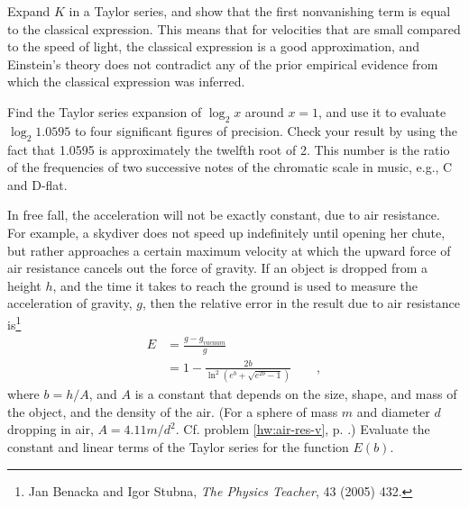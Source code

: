 \begin{hwsection}
\begin{hw}
Expand $K$ in a Taylor series, and show that the first
nonvanishing term is equal to the classical expression. This means that for velocities that
are small compared to the speed of light, the classical expression is a good approximation,
and Einstein's theory does not contradict any of the prior empirical evidence from which
the classical expression was inferred.
\end{hw}

\pagebreak

\begin{hw}
Find the Taylor series expansion of $\log_2 x$ around $x=1$, and use it to evaluate
$\log_2 1.0595$ to four significant figures of precision. Check your result by using the
fact that 1.0595 is approximately the twelfth root of 2. This number is the ratio of
the frequencies of two successive notes of the chromatic scale
in music, e.g., C and D-flat.
\end{hw}

\begin{hw}\label{hw:air-res-taylor}
In free fall, the acceleration will not be exactly constant, due to air resistance. For example,
a skydiver does not speed up indefinitely until opening her chute, but rather approaches a certain
maximum velocity at which the upward force of air resistance cancels out the force of gravity.
If an object is dropped from a height $h$, and the time it takes to reach the ground is used to
measure the acceleration of gravity, $g$, then the relative error in the result due to air
resistance is\footnote{Jan Benacka
and Igor Stubna, \emph{The Physics Teacher}, 43 (2005) 432.}
\begin{align*}
  E &= \frac{g-g_{vacuum}}{g} \\
   & = 1-\frac{2b}{\ln^2\left(e^b+\sqrt{e^{2b}-1}\right)} \qquad ,
\end{align*}
where $b=h/A$, and
$A$ is a constant that depends on the size, shape, and mass of the object, and the density of
the air.   (For a sphere of mass $m$ and diameter $d$ dropping in air, $A=4.11m/d^2$. Cf. problem \ref{hw:air-res-v}, p. \pageref{hw:air-res-v}.)
Evaluate the constant and linear terms of the Taylor series for the function $E(b)$.
\end{hw}


\end{hwsection}
